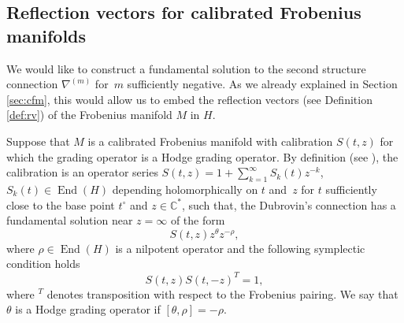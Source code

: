 \documentclass[pdftex]{sigma}
\numberwithin{equation}{section}
\newcommand{\CC}{\mathbb{C}}
\begin{document}
\subsection{Reflection vectors for calibrated Frobenius
 manifolds}\label{sec:pv}
We would like to construct a fundamental solution to the second
structure connection $\nabla^{(m)}$ for~$m$ sufficiently negative. As
we already explained in Section \ref{sec:cfm}, this would allow us to
embed the reflection vectors (see Definition \ref{def:rv}) of the
Frobenius manifold $M$ in $H$.

Suppose that $M$ is a calibrated Frobenius manifold with calibration
$S(t,z)$ for which the grading operator is a Hodge grading operator.
By definition (see \cite{Givental:qqh}), the calibration is an
operator series $S(t,z)=1+\sum_{k=1}^\infty S_k(t)z^{-k}$, $S_k(t)\in
\operatorname{End}(H)$ depending holomorphically on $t$ and~$z$ for
$t$ sufficiently close to the base point $t^\circ$ and $z\in \CC^*$,
such that, the Dubrovin's connection has a fundamental solution near
$z=\infty$ of the form
\[
S(t,z) z^{\theta} z^{-\rho},
\]
where $\rho\in \operatorname{End}(H)$ is a nilpotent operator
and the following symplectic condition holds
\[
S(t,z)S(t,-z)^T=1,
\]
where ${}^T$ denotes transposition with respect to the Frobenius
pairing. We say that $\theta$ is a Hodge grading operator if
$[\theta,\rho]=-\rho$.
\end{document}
